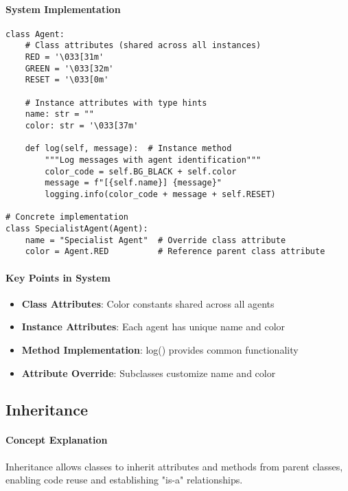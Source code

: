 \paragraph{System Implementation}
\begin{lstlisting}[caption=Agent Class Implementation]
class Agent:
    # Class attributes (shared across all instances)
    RED = '\033[31m'
    GREEN = '\033[32m'
    RESET = '\033[0m'
    
    # Instance attributes with type hints
    name: str = ""
    color: str = '\033[37m'
    
    def log(self, message):  # Instance method
        """Log messages with agent identification"""
        color_code = self.BG_BLACK + self.color
        message = f"[{self.name}] {message}"
        logging.info(color_code + message + self.RESET)

# Concrete implementation
class SpecialistAgent(Agent):
    name = "Specialist Agent"  # Override class attribute
    color = Agent.RED          # Reference parent class attribute
\end{lstlisting}

\paragraph{Key Points in System}
\begin{itemize}
\item \textbf{Class Attributes}: Color constants shared across all agents
\item \textbf{Instance Attributes}: Each agent has unique name and color
\item \textbf{Method Implementation}: log() provides common functionality
\item \textbf{Attribute Override}: Subclasses customize name and color
\end{itemize}

\subsection{Inheritance}

\paragraph{Concept Explanation}
Inheritance allows classes to inherit attributes and methods from parent classes, enabling code reuse and establishing "is-a" relationships.

